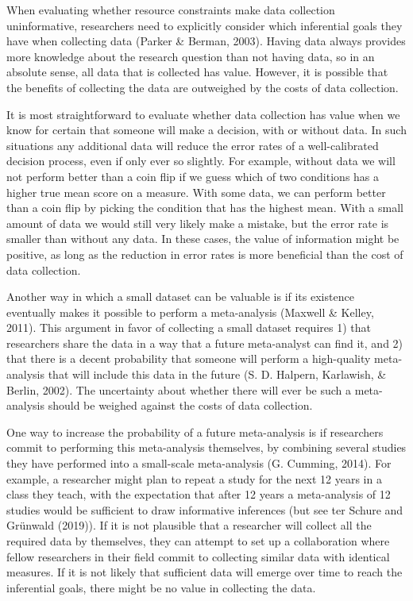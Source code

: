 \documentclass[
  english,
  ,jou, a4paper,floatsintext]{apa6}
\begin{document}
When evaluating whether resource constraints make data collection uninformative, researchers need to explicitly consider which inferential goals they have when collecting data (Parker \& Berman, 2003). Having data always provides more knowledge about the research question than not having data, so in an absolute sense, all data that is collected has value. However, it is possible that the benefits of collecting the data are outweighed by the costs of data collection.

It is most straightforward to evaluate whether data collection has value when we know for certain that someone will make a decision, with or without data. In such situations any additional data will reduce the error rates of a well-calibrated decision process, even if only ever so slightly. For example, without data we will not perform better than a coin flip if we guess which of two conditions has a higher true mean score on a measure. With some data, we can perform better than a coin flip by picking the condition that has the highest mean. With a small amount of data we would still very likely make a mistake, but the error rate is smaller than without any data. In these cases, the value of information might be positive, as long as the reduction in error rates is more beneficial than the cost of data collection.

Another way in which a small dataset can be valuable is if its existence eventually makes it possible to perform a meta-analysis (Maxwell \& Kelley, 2011). This argument in favor of collecting a small dataset requires 1) that researchers share the data in a way that a future meta-analyst can find it, and 2) that there is a decent probability that someone will perform a high-quality meta-analysis that will include this data in the future (S. D. Halpern, Karlawish, \& Berlin, 2002). The uncertainty about whether there will ever be such a meta-analysis should be weighed against the costs of data collection.

One way to increase the probability of a future meta-analysis is if researchers commit to performing this meta-analysis themselves, by combining several studies they have performed into a small-scale meta-analysis (G. Cumming, 2014). For example, a researcher might plan to repeat a study for the next 12 years in a class they teach, with the expectation that after 12 years a meta-analysis of 12 studies would be sufficient to draw informative inferences (but see ter Schure and Grünwald (2019)). If it is not plausible that a researcher will collect all the required data by themselves, they can attempt to set up a collaboration where fellow researchers in their field commit to collecting similar data with identical measures. If it is not likely that sufficient data will emerge over time to reach the inferential goals, there might be no value in collecting the data.
\end{document}
